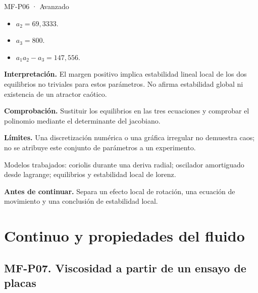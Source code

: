 \begin{studiumworked}{MF-P06 · Avanzado}
\begin{itemize}
\item $a_2=69{,}3333$.

\item $a_3=800$.

\item $a_1a_2-a_3=147{,}556$.

\end{itemize}

\textbf{Interpretación.} El margen positivo implica estabilidad lineal local de los dos equilibrios no triviales para estos parámetros. No afirma estabilidad global ni existencia de un atractor caótico.

\textbf{Comprobación.} Sustituir los equilibrios en las tres ecuaciones y comprobar el polinomio mediante el determinante del jacobiano.

\textbf{Límites.} Una discretización numérica o una gráfica irregular no demuestra caos; no se atribuye este conjunto de parámetros a un experimento.

\end{studiumworked}



\begin{tcolorbox}[studiumcheck,breakable=false,title={Síntesis y comprobación}]Modelos trabajados: coriolis durante una deriva radial; oscilador amortiguado desde lagrange; equilibrios y estabilidad local de lorenz.\par\textbf{Antes de continuar.} Separa un efecto local de rotación, una ecuación de movimiento y una conclusión de estabilidad local.\end{tcolorbox}

\chapter{Continuo y propiedades del fluido}


\Needspace{.30\textheight}\section{MF-P07. Viscosidad a partir de un ensayo de placas}

